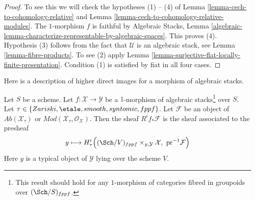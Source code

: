 \begin{proof}
To see this we will check the hypotheses (1) -- (4) of
Lemma \ref{lemma-cech-to-cohomology-relative} and
Lemma \ref{lemma-cech-to-cohomology-relative-modules}.
The $1$-morphism $f$ is faithful by
Algebraic Stacks, Lemma
\ref{algebraic-lemma-characterize-representable-by-algebraic-spaces}.
This proves (4).
Hypothesis (3) follows from the fact that $\mathcal{U}$ is an algebraic
stack, see
Lemma \ref{lemma-fibre-products}.
To see (2) apply
Lemma \ref{lemma-surjective-flat-locally-finite-presentation}.
Condition (1) is satisfied by fiat in all four cases.
\end{proof}

\noindent
Here is a description of higher direct images for a
morphism of algebraic stacks.

\begin{lemma}
\label{lemma-pushforward-restriction}
Let $S$ be a scheme. Let $f : \mathcal{X} \to \mathcal{Y}$ be a
$1$-morphism of algebraic stacks\footnote{This result should hold
for any $1$-morphism of categories fibred in groupoids over
$(\Sch/S)_{fppf}$.} over $S$.
Let $\tau \in \{Zariski,\linebreak[0] \etale,\linebreak[0]
smooth,\linebreak[0] syntomic,\linebreak[0] fppf\}$.
Let $\mathcal{F}$ be
an object of $\textit{Ab}(\mathcal{X}_\tau)$ or
$\textit{Mod}(\mathcal{X}_\tau, \mathcal{O}_\mathcal{X})$.
Then the sheaf $R^if_*\mathcal{F}$ is the sheaf associated to the
presheaf
$$
y \longmapsto
H^i_\tau\Big((\Sch/V)_{fppf} \times_{y, \mathcal{Y}} \mathcal{X},
\ \text{pr}^{-1}\mathcal{F}\Big)
$$
Here $y$ is a typical object of $\mathcal{Y}$ lying over the scheme $V$.
\end{lemma}

